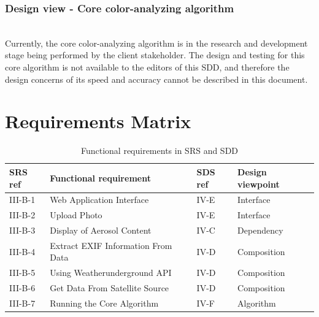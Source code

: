 \documentclass[onecolumn, draftclsnofoot,10pt, compsoc]{IEEEtran}
\begin{document}
\begin{flushleft}
\medskip

\subsubsection{Design view - Core color-analyzing algorithm} \ \\
Currently, the core color-analyzing algorithm is in the research and development stage being performed by the client stakeholder. The design and testing for this core algorithm is not available to the editors of this SDD, and therefore the design concerns of its speed and accuracy cannot be described in this document. 

\clearpage

\section{Requirements Matrix}
\begin{table}[h!]
\caption{Functional requirements in SRS and SDD}\label{table:2}
\centering
\begin{tabular}{| p{2cm} | p{5cm} | p{2cm} | p{4cm} |}
\hline
\textbf{SRS ref} & \textbf{Functional requirement} & \textbf{SDS ref} & \textbf{Design viewpoint}\\
\hline
III-B-1 & Web Application Interface & IV-E & Interface \\
\hline
III-B-2 & Upload Photo & IV-E & Interface \\
\hline
III-B-3 & Display of Aerosol Content & IV-C & Dependency \\
\hline
III-B-4 & Extract EXIF Information From Data & IV-D & Composition \\
\hline
III-B-5 & Using Weatherunderground API & IV-D & Composition \\
\hline
III-B-6 & Get Data From Satellite Source & IV-D & Composition \\
\hline
III-B-7 & Running the Core Algorithm & IV-F & Algorithm \\
\hline
\end{tabular}
\end{table}
\end{flushleft}
\end{document}
